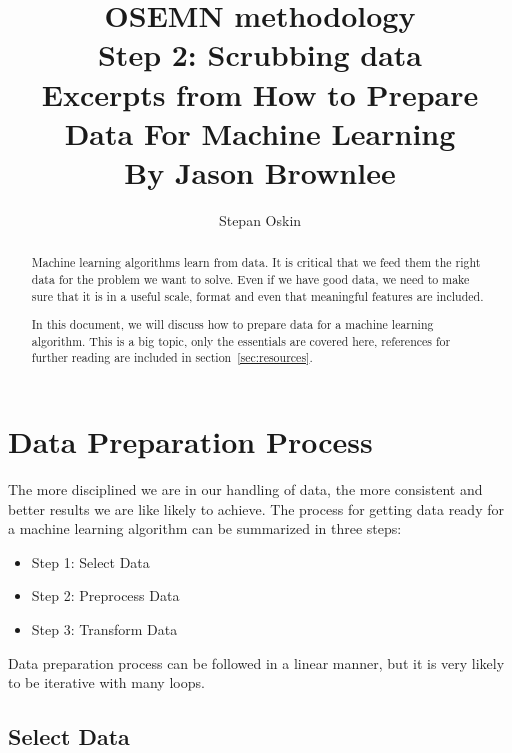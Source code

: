 \documentclass[11pt]{article}
\begin{document}
    \title{OSEMN methodology \\
    Step 2: Scrubbing data \\
    Excerpts from How to Prepare Data For Machine Learning \\
    By Jason Brownlee\cite{Brownlee2013} }

    \author{Stepan Oskin}

    \maketitle

    \begin{abstract}
        Machine learning algorithms learn from data.
        It is critical that we feed them the right data for the problem we want to solve.
        Even if we have good data, we need to make sure that it is in a useful scale, format and even that meaningful features are included.

        In this document, we will discuss how to prepare data for a machine learning algorithm.
        This is a big topic, only the essentials are covered here, references for further reading are included in section~\ref{sec:resources}.
    \end{abstract}

    \section{Data Preparation Process} \label{sec:data_prep}

    The more disciplined we are in our handling of data, the more consistent and better results we are like likely to achieve.
    The process for getting data ready for a machine learning algorithm can be summarized in three steps:

    \begin{itemize}
        \item Step 1: Select Data
        \item Step 2: Preprocess Data
        \item Step 3: Transform Data
    \end{itemize}

    Data preparation process can be followed in a linear manner, but it is very likely to be iterative with many loops.

    \subsection{Select Data} \label{subsec:sel_data}
\end{document}
